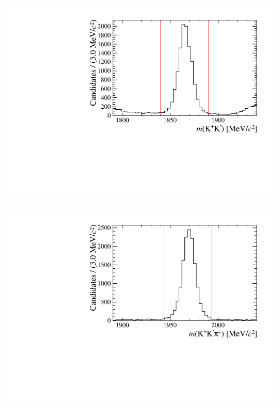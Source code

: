\begin{figure}[!h]
   \centering
   \begin{subfigure}[t]{1.0\textwidth}
   \centering
     \begin{subfigure}[t]{0.35\textwidth}
        \centering
        \includegraphics[width=1.0\textwidth]{figs/Selection/Phimass_KKPi_B2DsD0.pdf}
     \end{subfigure}
     \begin{subfigure}[t]{0.35\textwidth}
        \centering
        \includegraphics[width=1.0\textwidth]{figs/Selection/Dmass_KKPi_B2DsD0.pdf}
     \end{subfigure}
     \caption{\decay{\Dsp}{\Kp\Km\pip}}
   \end{subfigure}   

\end{figure}
